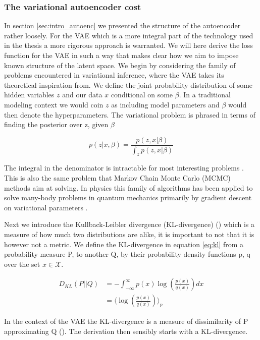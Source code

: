 \subsubsection*{The variational autoencoder cost}

In section \ref{sec:intro_autoenc} we presented the structure of the autoencoder rather loosely. For the VAE which is a more integral part of the technology used in the thesis a more rigorous approach is warranted. We will here derive the loss function for the VAE in such a way that makes clear how we aim to impose known structure of the latent space. We begin by considering the family of problems encountered in variational inference, where the VAE takes its theoretical inspiration from. We define the joint probability distribution of some hidden variables $z$ and our data $x$ conditional on some $\beta$. In a traditional modeling context we would coin $z$ as including model parameters and $\beta$ would then denote the hyperparameters. The variational problem is phrased in terms of finding the posterior over z, given $\beta$ 

\begin{equation}\label{eq:vbayes}
p(z | x, \beta) = \frac{p(z, x|\beta)}{\int_z p (z, x|\beta)}
\end{equation}

\noindent The integral in the denominator is intractable for most interesting problems . This is also the same problem that Markov Chain Monte Carlo (MCMC) methods aim at solving. In physics this family of algorithms has been applied to solve many-body problems in quantum mechanics primarily by gradient descent on variational parameters .

\noindent Next we introduce the Kullback-Leibler divergence (KL-divergence) (\cite{Kullback1951}) which is a measure of how much two distributions are alike, it is important to not that it is however not a metric. We define the KL-divergence in equation \ref{eq:kl} from a probability measure P, to another Q, by their probability density functions p, q over the set $x \in \mathcal{X}$. 

\begin{align}\label{eq:kl}
D_{KL} (P || Q) &= - \int^{\infty}_{-\infty} p(x) \log \left(\frac{p(x)}{q(x)}\right) dx \\
&= \langle \log \left(\frac{p(x)}{q(x)} \right)\rangle_{p}
\end{align}

\noindent In the context of the VAE the KL-divergence is a measure of dissimilarity of P approximating Q (\cite{Burnham2002}). The derivation then sensibly starts with a KL-divergence. \\

